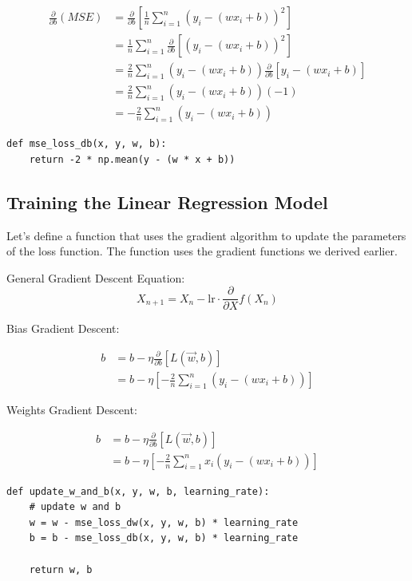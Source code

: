 \documentclass[openany]{book}
\begin{document}
\begin{align*}
\frac{\partial}{\partial b} \left( MSE \right) &=  \frac{\partial }{\partial b}[\frac{1}{n} \sum_{i=1}^{n}(y_{i}-(w x_{i} + b))^2] \\
&= \frac{1}{n} \sum_{i=1}^{n} \frac{\partial }{\partial b}[(y_{i}-(w x_{i} + b))^2] \\
&= \frac{2}{n} \sum_{i=1}^{n} (y_{i}-(w x_{i} + b))\frac{\partial }{\partial b}[y_{i}-(w x_{i} + b)] \\
&= \frac{2}{n} \sum_{i=1}^{n} (y_{i}-(w x_{i} + b))(-1) \\ 
&= -\frac{2}{n} \sum_{i=1}^{n} (y_{i}-(w x_{i} + b))
\end{align*}

\begin{tcolorbox}
\tiny
\begin{verbatim}
def mse_loss_db(x, y, w, b):
    return -2 * np.mean(y - (w * x + b))
\end{verbatim}
\end{tcolorbox}

    \subsection{Training the Linear Regression
Model}\label{training-the-linear-regression-model}

    Let's define a function that uses the gradient algorithm to update the
parameters of the loss function. The function uses the gradient
functions we derived earlier.

General Gradient Descent Equation:
\[
X_{n+1} = X_n - \text{lr} \cdot \frac{\partial}{\partial X} f(X_n)
\]

Bias Gradient Descent:

\begin{align*}
b &= b - \eta \frac{\partial}{\partial b} [L(\vec{w}, b)] \\
&= b - \eta [-\frac{2}{n} \sum_{i=1}^{n} (y_{i}-(w x_{i} + b))]
\end{align*}

    Weights Gradient Descent:

\begin{align*}
b &= b - \eta \frac{\partial}{\partial b} [L(\vec{w}, b)] \\
&= b - \eta [-\frac{2}{n} \sum_{i=1}^{n}x_{i}(y_{i}-(w x_{i} + b))]
\end{align*}

\begin{tcolorbox}
\tiny
\begin{verbatim}
def update_w_and_b(x, y, w, b, learning_rate):
    # update w and b
    w = w - mse_loss_dw(x, y, w, b) * learning_rate
    b = b - mse_loss_db(x, y, w, b) * learning_rate

    return w, b
\end{verbatim}
\end{tcolorbox}
\end{document}
